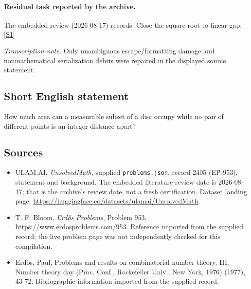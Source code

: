 \documentclass[11pt,a4paper]{article}
\newcommand{\sref}[2]{\hyperlink{source:#1:#2}{[S#2]}}
\begin{document}
\paragraph{Residual task reported by the archive.}

The embedded review (2026-08-17) records: Close the square-root-to-linear gap. \sref{2405}{1}

{\small\emph{Transcription note.} Only unambiguous escape/formatting damage and nonmathematical serialization debris were repaired in the displayed source statement.}

\subsection{Short English statement}

How much area can a measurable subset of a disc occupy while no pair of different points is an integer distance apart?

\subsection{Sources}

{\small

\begin{itemize}

\item[\hypertarget{source:2405:1}{S1}] ULAM.AI, \emph{UnsolvedMath}, supplied \texttt{problems.json}, record 2405 (EP-953), statement and background. The embedded literature-review date is 2026-08-17; that is the archive’s review date, not a fresh certification. Dataset landing page: \url{https://huggingface.co/datasets/ulamai/UnsolvedMath}.

\item[\hypertarget{source:2405:2}{S2}] T. F. Bloom, \emph{Erdős Problems}, Problem 953, \url{https://www.erdosproblems.com/953}. Reference imported from the supplied record; the live problem page was not independently checked for this compilation.

\item[\hypertarget{source:2405:3}{S3}] Erd\H{o}s, Paul, Problems and results on combinatorial number theory. III. Number theory day (Proc. Conf., Rockefeller Univ., New York, 1976) (1977), 43-72. Bibliographic information imported from the supplied record.

\end{itemize}

}

\label{end:2405}
\end{document}
